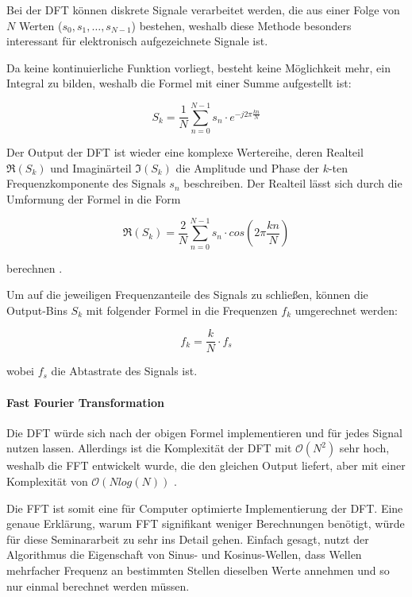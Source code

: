 Bei der \ac{DFT} können diskrete Signale verarbeitet werden, die aus einer Folge von $N$ Werten ($s_0, s_1, \dots, s_{N-1}$) bestehen, weshalb diese Methode besonders interessant für elektronisch aufgezeichnete Signale ist.

Da keine kontinuierliche Funktion vorliegt, besteht keine Möglichkeit mehr, ein Integral zu bilden, weshalb die Formel mit einer Summe aufgestellt ist:

\begin{equation}
    S_k = \frac{1}{N} \sum_{n=0}^{N-1} s_n \cdot e^{-j2\pi \frac{kn}{N}}
\end{equation}

Der Output der \ac{DFT} ist wieder eine komplexe Wertereihe, deren Realteil $\Re(S_k)$ und Imaginärteil $\Im(S_k)$ die Amplitude und Phase der $k$-ten Frequenzkomponente des Signals $s_n$ beschreiben.
Der Realteil lässt sich durch die Umformung der Formel in die Form

\begin{equation}
    \Re(S_k) = \frac{2}{N} \sum_{n=0}^{N-1} s_n \cdot cos(2\pi \frac{kn}{N})
\end{equation}

berechnen \autocite[vgl.][S. 567ff]{smith_scientist_1997}.

Um auf die jeweiligen Frequenzanteile des Signals zu schließen, können die Output-Bins $S_k$ mit folgender Formel in die Frequenzen $f_k$ umgerechnet werden:

\begin{equation}
    f_k = \frac{k}{N} \cdot f_s
\end{equation}

wobei $f_s$ die Abtastrate des Signals ist.

\paragraph{Fast Fourier Transformation}

Die \ac{DFT} würde sich nach der obigen Formel implementieren und für jedes Signal nutzen lassen.
Allerdings ist die Komplexität der \ac{DFT} mit $\mathcal{O}(N^2)$ sehr hoch, weshalb die \ac{FFT} entwickelt wurde, die den gleichen Output liefert, aber mit einer Komplexität von $\mathcal{O}(N log(N))$ \autocite[vgl.][S. 338]{beucher_signale_2011}.

Die \ac{FFT} ist somit eine für Computer optimierte Implementierung der \ac{DFT}.
Eine genaue Erklärung, warum \ac{FFT} signifikant weniger Berechnungen benötigt, würde für diese Seminararbeit zu sehr ins Detail gehen.
Einfach gesagt, nutzt der Algorithmus die Eigenschaft von Sinus- und Kosinus-Wellen, dass Wellen mehrfacher Frequenz an bestimmten Stellen dieselben Werte annehmen und so nur einmal berechnet werden müssen.

